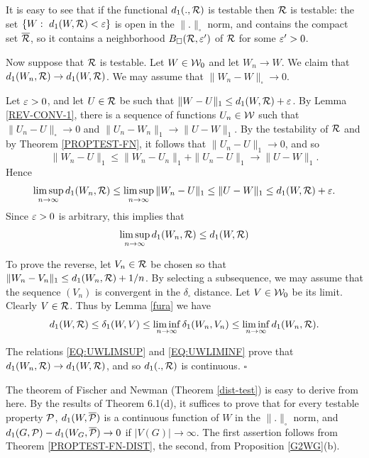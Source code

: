 \documentclass{article}
\newenvironment{proof}{\medskip\noindent{\bf Proof. }}{\hfill$\square$\medskip}
\begin{document}
\begin{proof}
It is easy to see that if the functional $d_1(.,\mathcal{R})$ is testable
then $\mathcal{R}$ is testable: the set $\{W:~d_1(W,\mathcal{R})<\varepsilon\}$ is open in
the $\|.\|_\square$ norm, and contains the compact set
$\overline{\mathcal{R}}$, so it contains a neighborhood $B_\square(\mathcal{R},\varepsilon')$
of $\mathcal{R}$ for some $\varepsilon'>0$.

Now suppose that $\mathcal{R}$ is testable. Let $W\in\mathcal{W}_0$ and let $W_n\to
W$. We claim that $d_1(W_n,\mathcal{R})\to d_1(W,\mathcal{R})$. We may assume that
$\|W_n-W\|_\square\to 0$.

Let $\varepsilon>0$, and let $U\in\mathcal{R}$ be such that $\|W-U\|_1\le
d_1(W,\mathcal{R})+\varepsilon$. By Lemma \ref{REV-CONV-1}, there is a sequence of
functions $U_n\in\mathcal{W}$ such that $\|U_n-U\|_\square\to 0$ and
$\|U_n-W_n\|_1\to \|U-W\|_1$. By the testability of $\mathcal{R}$ and by
Theorem \ref{PROPTEST-FN}, it follows that $\|U_n-U\|_1\to 0$, and so
\[
\|W_n-U\|_1 \le  \|W_n-U_n\|_1 + \|U_n-U\|_1 \to\|U-W\|_1.
\]
Hence
\[
\limsup_{n\to\infty} d_1(W_n,\mathcal{R}) \le\limsup_{n\to\infty} \|W_n-U\|_1
\le  \|U-W\|_1 \le d_1(W,\mathcal{R})+\varepsilon.
\]
Since $\varepsilon>0$ is arbitrary, this implies that
\begin{equation}\label{EQ:UWLIMSUP}
\limsup_{n\to\infty} d_1(W_n,\mathcal{R}) \le d_1(W,\mathcal{R})
\end{equation}

To prove the reverse, let $V_n\in\mathcal{R}$ be chosen so that
$\|W_n-V_n\|_1 \le d_1(W_n,\mathcal{R})+1/n$. By selecting a subsequence, we
may assume that the sequence $(V_n)$ is convergent in the
$\delta_\square$ distance. Let $V\in\mathcal{W}_0$ be its limit. Clearly
$V\in\mathcal{R}$. Thus by Lemma \ref{fura} we have
\begin{equation}\label{EQ:UWLIMINF}
d_1(W,\mathcal{R}) \le \delta_1(W,V) \le\liminf_{n\to\infty}
\delta_1(W_n,V_n) \le \liminf_{n\to\infty} d_1(W_n,\mathcal{R}).
\end{equation}

The relations \eqref{EQ:UWLIMSUP} and \eqref{EQ:UWLIMINF} prove that
$d_1(W_n,\mathcal{R})\to d_1(W,\mathcal{R})$, and so $d_1(.,\mathcal{R})$ is continuous.
\end{proof}

The theorem of Fischer and Newman (Theorem \ref{dist-test}) is easy
to derive from here. By the results of \cite{BCLSV1} Theorem 6.1(d),
it suffices to prove that for every testable property $\mathcal{P}$,
$d_1(W,\overline{\mathcal{P}})$ is a continuous function of $W$ in the
$\|.\|_\square$ norm, and $d_1(G,\mathcal{P})-d_1(W_G,\overline{\mathcal{P}})\to 0$ if
$|V(G)|\to\infty$. The first assertion follows from Theorem
\ref{PROPTEST-FN-DIST}, the second, from Proposition \ref{G2WG}(b).
\end{document}
